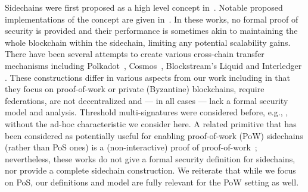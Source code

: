 Sidechains were first proposed as a high level concept in~\cite{sidechains}.
Notable proposed implementations of the concept are given in~\cite{drivechains,lerner}.
In these works, no formal proof of security
is provided and their performance is sometimes akin to maintaining the whole
blockchain within the sidechain, limiting any potential scalability gains.
%
There have been several attempts to create various cross-chain transfer
mechanisms including Polkadot~\cite{wood2016polkadot},
Cosmos~\cite{buchman2016tendermint}, Blockstream's Liquid \cite{DBLP:journals/corr/DilleyPWPGF16} and Interledger \cite{interledger}. These constructions  differ in various aspects from our work including in that
they focus on proof-of-work or private (Byzantine) blockchains, require
federations, are not decentralized and --- in all cases ---
 lack a formal security model and analysis.
Threshold multi-signatures were considered before, e.g., \cite{DBLP:conf/eurocrypt/LiHL94},
without the ad-hoc characteristic we consider here.
A related primitive that has been considered as potentially useful for enabling
proof-of-work (PoW) sidechains (rather than PoS ones) is a (non-interactive) proof of
proof-of-work~\cite{FCW:KiaLamSto16,nipopows}; nevertheless,  these works do not give a
formal security definition for sidechains, nor provide a complete sidechain
construction. We reiterate that while we focus on  PoS, our definitions and model
are fully relevant for the PoW setting as well.
